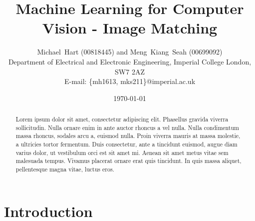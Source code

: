 \documentclass[a4paper, 10pt, conference]{ieeeconf}
\begin{document}
\title{Machine Learning for Computer Vision - Image Matching}
\author{Michael~Hart (00818445) and
        Meng~Kiang~Seah (00699092)
\\
        Department of Electrical and Electronic Engineering,
        Imperial College London,
        SW7 2AZ
\\
        E-mail: \{mh1613, mks211\}@imperial.ac.uk}
\date{\today}




\maketitle


\begin{abstract}
Lorem ipsum dolor sit amet, consectetur adipiscing elit. Phasellus gravida viverra sollicitudin. Nulla ornare enim in ante auctor rhoncus a vel nulla. Nulla condimentum massa rhoncus, sodales arcu a, euismod nulla. Proin viverra mauris at massa molestie, a ultricies tortor fermentum. Duis consectetur, ante a tincidunt euismod, augue diam varius dolor, ut vestibulum orci est sit amet mi. Aenean sit amet metus vitae sem malesuada tempus. Vivamus placerat ornare erat quis tincidunt. In quis massa aliquet, pellentesque magna vitae, luctus eros.

\end{abstract}

\section{Introduction}
\end{document}
